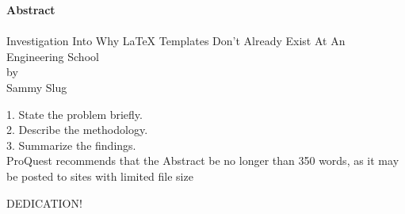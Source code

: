 \documentclass[11pt,oneside,a4paper,onecolumn]{article}                 %
\begin{document}

\listoftables %
\pagebreak[4]


\thispagestyle{empty} %
\begin{center}
{\bf Abstract}\\
\ \\
Investigation Into Why LaTeX Templates Don't Already Exist At An Engineering School\\
by\\
Sammy Slug\\
\end{center}
1. State the problem briefly.\\
2. Describe the methodology.\\
3. Summarize the findings.\\
ProQuest recommends that the Abstract be no longer than 350 words, as it may be posted to sites with limited file size


\pagebreak[4]




DEDICATION!

\pagebreak[4]

\end{document}
